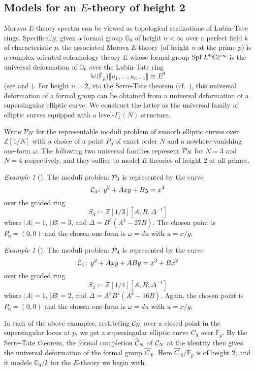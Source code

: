 \documentclass{gtpart}
\theoremstyle{definition}
\theoremstyle{remark}
\newtheorem{ex}[thm]{Example}
\def\co{\colon\thinspace}
\newcommand{\mb}[1]{\mathbb{#1}}
\newcommand{\Spf}{{\rm Spf\thinspace}}
\newcommand{\cF}{\overline {\mb F}}
\newcommand{\CC}{{\cal C}}
\newcommand{\CP}{{\cal P}}
\newcommand{\BC}{{\mb C}}
\newcommand{\BG}{{\mb G}}
\newcommand{\BP}{{\mb P}}
\newcommand{\BW}{{\mb W}}
\newcommand{\BZ}{{\mb Z}}
\newcommand{\HC}{\widehat{C~}\!}
\newcommand{\HCC}{\widehat{~\!\!\CC}}
\renewcommand{\D}{\Delta}
\newcommand{\G}{\Gamma}
\renewcommand{\o}{\omega}
\newcommand{\ce}{\coloneqq}
\newcommand{\lb}{\llbracket}
\newcommand{\rb}{\rrbracket}
\renewcommand{\=}{\approx}
\renewcommand{\-}{\sim}
\numberwithin{equation}{section}
\numberwithin{thm}{section}
\begin{document}
\subsection{Models for an $E$-theory of height 2}
\label{subsec:model}

Morava $E$-theory spectra can be viewed as topological realizations of Lubin-Tate rings.  
Specifically, given a formal group $\BG_0$ of height $n < \infty$ over a perfect field $k$ of characteristic $p$, 
the associated Morava $E$-theory (of height $n$ at the prime $p$) is a complex-oriented 
cohomology theory $E$ whose formal group $\Spf E^0 \BC\BP^\infty$ is the 
universal deformation of $\BG_0$ over the Lubin-Tate ring 
\[
 \BW \big( \cF_p \big) \lb u_1, \ldots, u_{n - 1} \rb \cong E^0 
\]
(see \cite[Section 3]{LT} and \cite[Section 7]{GH}).  
For height $n = 2$, via the Serre-Tate theorem \cite{LST} (cf.~\cite[Theorem 2.9.1]{KM}), 
this universal deformation of a formal group can be obtained from a universal deformation of a supersingular 
elliptic curve.  We construct the latter as the universal family of elliptic curves equipped 
with a level-$\G_1(N)$ structure.  

Write $\CP_N$ for the representable moduli problem of smooth elliptic curves over $\BZ[1/N]$ 
with a choice of a point $P_0$ of exact order $N$ and a nowhere-vanishing one-form $\o$.  
The following two universal families represent $\CP_N$ for $N = 3$ and $N = 4$ respectively, 
and they suffice to model $E$-theories of height 2 at all primes.  
\begin{ex}[{\cite[Proposition 3.2]{tmf3}}]
 \label{ex:3}
 The moduli problem $\CP_3$ is represented by the curve 
 \[
  \CC_3 \co y^2 + A x y + B y = x^3 
 \]
 over the graded ring 
 \[
  S_3 \ce \BZ[1/3][A, B, \D^{-1}] 
 \]
 where $|A| = 1$, $|B| = 3$, and $\D = B^3 (A^3 - 27 B)$.  The chosen point is $P_0 = (0,0)$ 
 and the chosen one-form is $\o = du$ with $u = x / y$.  
\end{ex}
\begin{ex}[{\cite[Proposition 2.1]{p3}}]
 \label{ex:4}
 The moduli problem $\CP_4$ is represented by the curve 
 \[
  \CC_4 \co y^2 + A x y + A B y = x^3 + B x^2 
 \]
 over the graded ring 
 \[
  S_4 \ce \BZ[1/4][A, B, \D^{-1}] 
 \]
 where $|A| = 1$, $|B| = 2$, and $\D = A^2 B^4 (A^2 - 16 B)$.  Again, the chosen point is 
 $P_0 = (0,0)$ and the chosen one-form is $\o = du$ with $u = x / y$.  
\end{ex}
In each of the above examples, restricting $\CC_N$ over a closed point in the supersingular locus at $p$, 
we get a supersingular elliptic curve $C_0$ over $\cF_p$.  
By the Serre-Tate theorem, the formal completion $\HCC_N$ of $\CC_N$ at the identity then gives the universal deformation of the formal group $\HC_0$.  
Here $\HC_0 / \cF_p$ is of height 2, and it models $\BG_0 / k$ for the $E$-theory we begin with.  
\end{document}

